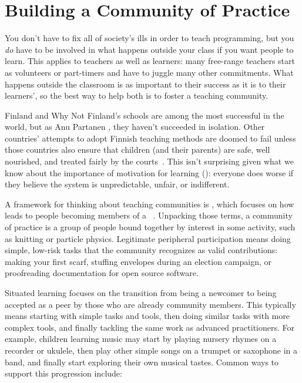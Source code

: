 \chapter{Building a Community of Practice}\label{s:community}

You don't have to fix all of society's ills in order to teach programming,
but you \emph{do} have to be involved in
what happens outside your class if you want people to learn.
This applies to teachers as well as learners:
many free-range teachers start as volunteers or part-timers
and have to juggle many other commitments.
What happens outside the classroom is as important to their success
as it is to their learners',
so the best way to help both is to foster a teaching community.

\begin{aside}{Finland and Why Not}
  Finland's schools are among the most successful in the world,
  but as Anu Partanen
  ,
  they haven't succeeded in isolation.
  Other countries' attempts to adopt Finnish teaching methods are doomed to fail
  unless those countries also ensure that children (and their parents) are safe,
  well nourished,
  and treated fairly by the courts~\cite{Sahl2015,Wilk2011}.
  This isn't surprising given what we know about the importance of motivation for learning ():
  everyone does worse if they believe the system is unpredictable, unfair, or indifferent.
\end{aside}

A framework for thinking about teaching communities is ,
which focuses on how 
leads to people becoming members of
a ~\cite{Weng2015}.
Unpacking those terms,
a community of practice is a group of people bound together by interest in some activity,
such as knitting or particle physics.
Legitimate peripheral participation means doing simple, low-risk tasks
that the community recognizes as valid contributions:
making your first scarf,
stuffing envelopes during an election campaign,
or proofreading documentation for open source software.

Situated learning focuses on the transition from being a newcomer
to being accepted as a peer by those who are already community members.
This typically means starting with simple tasks and tools,
then doing similar tasks with more complex tools,
and finally tackling the same work as advanced practitioners.
For example,
children learning music may start by playing nursery rhymes on a recorder or ukulele,
then play other simple songs on a trumpet or saxophone in a band,
and finally start exploring their own musical tastes.
Common ways to support this progression include:

